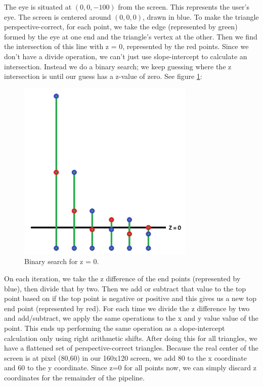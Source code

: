 \documentclass[onecolumn]{IEEEtran}
\begin{document}
The eye is situated at $(0,0,-100)$ from the screen.  This represents the user's eye.  The screen is centered around $(0,0,0)$, drawn in blue.  To make the triangle perspective-correct, for each point, we take the edge (represented by green) formed by the eye at one end and the triangle's vertex at the other.  Then we find the intersection of this line with z = 0, represented by the red points.  Since we don't have a divide operation, we can't just use slope-intercept to calculate an intersection.  Instead we do a binary search; we keep guessing where the z intersection is until our guess has a z-value of zero.  See figure \ref{fig:binarySearch}:

\begin{figure}[H]
	\centering
	\includegraphics[width=0.75\textwidth]{binarySearch.png}
	\caption{Binary search for z = 0.}
	\label{fig:binarySearch}
\end{figure}

On each iteration, we take the z difference of the end points (represented by blue), then divide that by two.  Then we add or subtract that value to the top point based on if the top point is negative or positive and this gives us a new top end point (represented by red).  For each time we divide the z difference by two and add/subtract, we apply the same operations to the x and y value value of the point.  This ends up performing the same operation as a slope-intercept calculation only using right arithmetic shifts.  After doing this for all triangles, we have a flattened set of perspective-correct triangles.  Because the real center of the screen is at pixel (80,60) in our 160x120 screen, we add 80 to the x coordinate and 60 to the y coordinate.  Since z=0 for all points now, we can simply discard z coordinates for the remainder of the pipeline.
\end{document}
